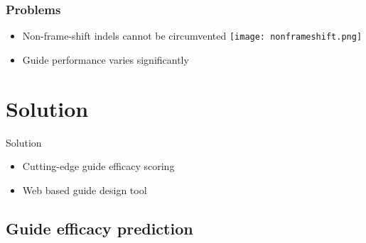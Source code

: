 \documentclass[Nike]{tuberlinbeamer}
\begin{document}
\begin{frame}
  \frametitle{Problems}
  \begin{itemize}
    \item Non-frame-shift indels cannot be circumvented
      \texttt{[image: nonframeshift.png]}
      \vspace{0.1cm}
    \pause
    \item Guide performance varies significantly
  \end{itemize}
\end{frame}

\section{Solution}


\begin{frame}{Solution}
  \begin{itemize}
    \vspace{0.2cm}
    \item Cutting-edge guide efficacy scoring
      \pause
    \vspace{0.2cm}
    \item Web based guide design tool
  \end{itemize}
\end{frame}


\subsection{Guide efficacy prediction}
\end{document}
